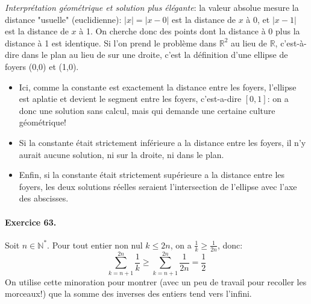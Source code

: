 \documentclass[a4paper,11pt]{article}
\begin{document}
\textit{Interprétation géométrique et solution plus élégante}: la valeur absolue mesure la distance "usuelle" (euclidienne): $|x|=|x-0|$ est la distance de $x$ à 0, et $|x-1|$ est la distance de $x$ à 1. On cherche donc des points dont la distance à 0 plus la distance à 1 est identique. Si l'on prend le problème dans $\mathbb{R}^2$ au lieu de $\mathbb{R}$, c'est-à-dire dans le plan au lieu de sur une droite, c'est la définition d'une ellipse de foyers (0,0) et (1,0).
\begin{itemize}
  \item Ici, comme la constante est exactement la distance entre les foyers, l'ellipse est aplatie et devient le segment entre les foyers, c'est-a-dire $[0,1]$: on a donc une solution sans calcul, mais qui demande une certaine culture géométrique!
  \item Si la constante était strictement inférieure a la distance entre les foyers, il n'y aurait aucune solution, ni sur la droite, ni dans le plan. 
  \item Enfin, si la constante était strictement supérieure a la distance entre les foyers, les deux solutions réelles seraient l'intersection de l'ellipse avec l'axe des abscisses.%
\end{itemize}

\paragraph{Exercice 63.} Soit $n\in\mathbb{N}^*$. Pour tout entier non nul $k\leq 2n$, on a $\frac{1}{k}\geq \frac{1}{2n}$, donc:
\[
\sum_{k=n+1}^{2n}{\frac{1}{k}}\geq \sum_{k=n+1}^{2n}{\frac{1}{2n}}=\frac{1}{2}
\]
On utilise cette minoration pour montrer (avec un peu de travail pour recoller les morceaux!) que la somme des inverses des entiers tend vers l'infini.
\end{document}
